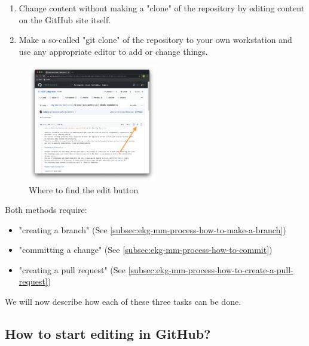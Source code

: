 \begin{enumerate}[label=(\Alph*)]
    \item Change content without making a "clone" of the repository by editing content on the GitHub site itself.
    \item Make a so-called "git clone" of the repository to your own workstation and use any appropriate editor to add or change things.
\end{enumerate}

%
%
\begin{figure}
    \vspace{-12pt}
    \begin{center}
        \includegraphics[width=0.50\textwidth]{../images/ekgmm-process-edit-content.png}
    \end{center}
    \caption{Where to find the edit button}
    \label{fig:ekgmm-process-edit-content}
\end{figure}

Both methods require:

\begin{itemize}
    \item "creating a branch" (See \ref{subsec:ekg-mm-process-how-to-make-a-branch})
    \item "committing a change" (See \ref{subsec:ekg-mm-process-how-to-commit})
    \item "creating a pull request" (See \ref{subsec:ekg-mm-process-how-to-create-a-pull-request})
\end{itemize}

We will now describe how each of these three tasks can be done.

\subsection{How to start editing in GitHub?}

